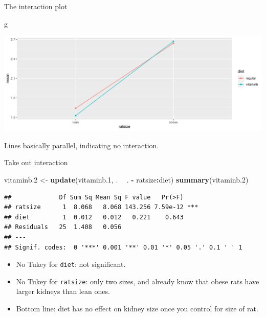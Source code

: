 \documentclass[
  ignorenonframetext,
]{beamer}
\newenvironment{Shaded}{\begin{snugshade}}{\end{snugshade}}
\newcommand{\FloatTok}[1]{\textcolor[rgb]{0.00,0.00,0.81}{#1}}
\newcommand{\KeywordTok}[1]{\textcolor[rgb]{0.13,0.29,0.53}{\textbf{#1}}}
\newcommand{\NormalTok}[1]{#1}
\newcommand{\OperatorTok}[1]{\textcolor[rgb]{0.81,0.36,0.00}{\textbf{#1}}}
\newcommand{\StringTok}[1]{\textcolor[rgb]{0.31,0.60,0.02}{#1}}
\begin{document}
\begin{frame}[fragile]{The interaction plot}
\protect\hypertarget{the-interaction-plot}{}

\begin{Shaded}
\begin{Highlighting}[]
\NormalTok{g}
\end{Highlighting}
\end{Shaded}

\includegraphics{slides_d29_files/figure-beamer/unnamed-chunk-200-1.pdf}

Lines basically parallel, indicating no interaction.

\end{frame}

\begin{frame}[fragile]{Take out interaction}
\protect\hypertarget{take-out-interaction}{}

\small

\begin{Shaded}
\begin{Highlighting}[]
\NormalTok{vitaminb}\FloatTok{.2}\NormalTok{ <-}\StringTok{ }\KeywordTok{update}\NormalTok{(vitaminb}\FloatTok{.1}\NormalTok{, . }\OperatorTok{~}\StringTok{ }\NormalTok{. }\OperatorTok{-}\StringTok{ }\NormalTok{ratsize}\OperatorTok{:}\NormalTok{diet)}
\KeywordTok{summary}\NormalTok{(vitaminb}\FloatTok{.2}\NormalTok{)}
\end{Highlighting}
\end{Shaded}

\begin{verbatim}
##             Df Sum Sq Mean Sq F value   Pr(>F)    
## ratsize      1  8.068   8.068 143.256 7.59e-12 ***
## diet         1  0.012   0.012   0.221    0.643    
## Residuals   25  1.408   0.056                     
## ---
## Signif. codes:  0 '***' 0.001 '**' 0.01 '*' 0.05 '.' 0.1 ' ' 1
\end{verbatim}

\normalsize

\begin{itemize}
\item
  No Tukey for \texttt{diet}: not significant.
\item
  No Tukey for \texttt{ratsize}: only two sizes, and already know that
  obese rats have larger kidneys than lean ones.
\item
  Bottom line: diet has no effect on kidney size once you control for
  size of rat.
\end{itemize}

\end{frame}
\end{document}
